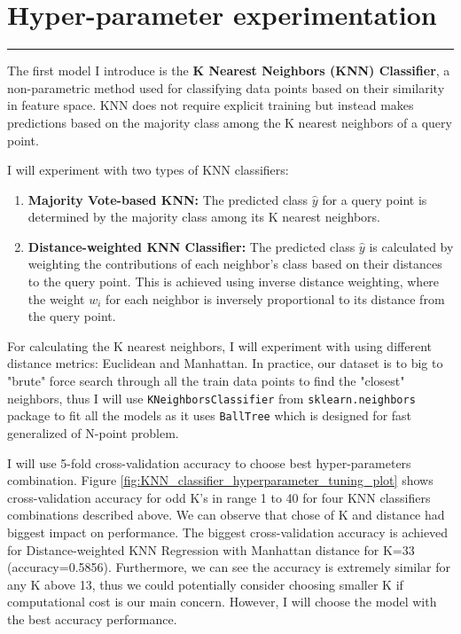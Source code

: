 \documentclass{assignment}
\begin{document}
\newpage

\section{Hyper-parameter experimentation}

\noindent\rule{16.5cm}{0.55pt}
\smallskip

The first model I introduce is the \textbf{K Nearest Neighbors (KNN) Classifier}, a non-parametric method used for classifying data points based on their similarity in feature space. KNN does not require explicit training but instead makes predictions based on the majority class among the K nearest neighbors of a query point.

I will experiment with two types of KNN classifiers:

\begin{enumerate}
    \item \textbf{Majority Vote-based KNN:} The predicted class $\hat{y}$ for a query point is determined by the majority class among its K nearest neighbors.

    \item \textbf{Distance-weighted KNN Classifier:} The predicted class $\hat{y}$ is calculated by weighting the contributions of each neighbor's class based on their distances to the query point. This is achieved using inverse distance weighting, where the weight $w_i$ for each neighbor is inversely proportional to its distance from the query point.
\end{enumerate}

For calculating the K nearest neighbors, I will experiment with using different distance metrics: Euclidean and Manhattan. In practice, our dataset is to big to "brute" force search through all the train data points to find the "closest" neighbors, thus I will use \texttt{KNeighborsClassifier} from \texttt{sklearn.neighbors} package to fit all the models as it uses \texttt{BallTree} which is designed for fast generalized of N-point problem.

\medskip

I will use 5-fold cross-validation accuracy to choose best hyper-parameters combination. Figure \ref{fig:KNN_classifier_hyperparameter_tuning_plot} shows cross-validation accuracy for odd K's in range 1 to 40 for four KNN classifiers combinations described above. We can observe that chose of K and distance had biggest impact on performance. The biggest cross-validation accuracy is achieved for Distance-weighted KNN Regression with Manhattan distance for K=33 (accuracy=0.5856). Furthermore, we can see the accuracy is extremely similar for any K above 13, thus we could potentially consider choosing smaller K if computational cost is our main concern. However, I will choose the model with the best accuracy performance.
\end{document}
